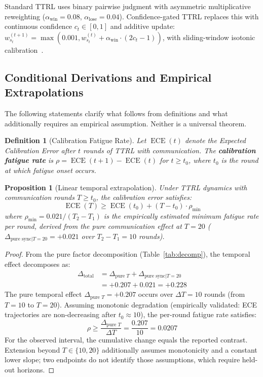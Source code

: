\documentclass[11pt]{article}
\DeclareMathOperator{\ECE}{ECE}
\newtheorem{definition}{Definition}
\newtheorem{proposition}[theorem]{Proposition}
\begin{document}
Standard TTRL uses binary pairwise judgment with asymmetric multiplicative reweighting ($\alpha_{\text{win}} = 0.08$, $\alpha_{\text{lose}} = 0.04$). Confidence-gated TTRL replaces this with continuous confidence $c_t \in [0,1]$ and additive update: $w_{s_t}^{(t+1)} = \max(0.001, w_{s_t}^{(t)} + \alpha_{\text{win}} \cdot (2c_t - 1))$, with sliding-window isotonic calibration~\citep{niculescu2005predicting}.

\subsection{Conditional Derivations and Empirical Extrapolations}

The following statements clarify what follows from definitions and what additionally requires an empirical assumption. Neither is a universal theorem.

\begin{definition}[Calibration Fatigue Rate]
Let $\ECE(t)$ denote the Expected Calibration Error after $t$ rounds of TTRL with communication. The \textbf{calibration fatigue rate} is $\rho = \ECE(t+1) - \ECE(t)$ for $t \geq t_0$, where $t_0$ is the round at which fatigue onset occurs.
\end{definition}

\begin{proposition}[Linear temporal extrapolation]\label{thm:fatigue}
Under TTRL dynamics with communication rounds $T \geq t_0$, the calibration error satisfies:
\begin{equation}
    \ECE(T) \geq \ECE(t_0) + (T - t_0) \cdot \rho_{\min}
\end{equation}
where $\rho_{\min} = 0.021 / (T_2 - T_1)$ is the empirically estimated minimum fatigue rate per round, derived from the pure communication effect at $T{=}20$ ($\Delta_{\text{pure sync}|T=20} = +0.021$ over $T_2 - T_1 = 10$ rounds).
\end{proposition}

\begin{proof}
From the pure factor decomposition (Table~\ref{tab:decomp}), the temporal effect decomposes as:
\begin{align}
    \Delta_{\text{total}} &= \Delta_{\text{pure } T} + \Delta_{\text{pure sync}|T=20} \\
    &= +0.207 + 0.021 = +0.228
\end{align}
The pure temporal effect $\Delta_{\text{pure } T} = +0.207$ occurs over $\Delta T = 10$ rounds (from $T{=}10$ to $T{=}20$). Assuming monotonic degradation (empirically validated: ECE trajectories are non-decreasing after $t_0 \approx 10$), the per-round fatigue rate satisfies:
\begin{equation}
    \rho \geq \frac{\Delta_{\text{pure } T}}{\Delta T} = \frac{0.207}{10} = 0.0207
\end{equation}
For the observed interval, the cumulative change equals the reported contrast. Extension beyond $T\in\{10,20\}$ additionally assumes monotonicity and a constant lower slope; two endpoints do not identify those assumptions, which require held-out horizons.
\end{proof}
\end{document}
